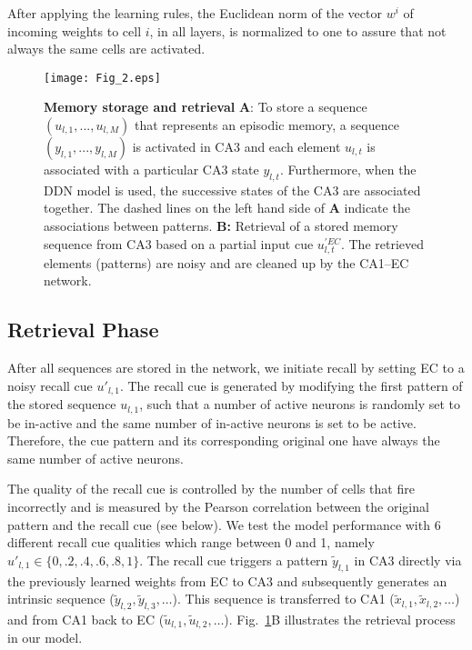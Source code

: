 \documentclass[utf8]{frontiersSCNS} %
\begin{document}
After applying the learning rules, the Euclidean norm of the vector $w^i$ of incoming weights to cell $i$, in all layers, is normalized to one to assure that not always the same cells are activated. 

\begin{figure}[!htb]
\centering\texttt{[image: Fig\_2.eps]}
\caption{\textbf{Memory storage and retrieval} \textbf A: To store a sequence $(u_{l,1} , . . . ,u_{l,M})$ that represents an episodic memory, a sequence $(y_{l,1} , . . . ,y_{l,M})$ is activated in CA3 and each element $u_{l,t}$ is associated with a particular CA3 state $y_{l,t}$. Furthermore, when the DDN model is used, the successive states of the CA3 are associated together. The dashed lines on the left hand side of \textbf{A} indicate the associations between patterns.  
\textbf{B:} Retrieval of a stored memory sequence from CA3 based on a partial input cue $u^{'EC}_{l,t}$. The retrieved elements (patterns) are noisy and are cleaned up by the CA1–EC network.}
\label{Fig_2}
\end{figure}

\subsection{Retrieval Phase}
\label{S:4}

After all sequences are stored in the network, we initiate recall by setting EC to a noisy recall cue $u'_{l, 1}$.  The recall cue is generated by modifying the first pattern of the stored sequence $u_{l, 1}$, such that a number of active neurons is randomly set to be in-active and the same number of in-active neurons is set to be active. 
%
Therefore, the cue pattern and its corresponding original one have always the same number of active neurons. 
 

The quality of the recall cue is controlled by the number of cells that fire incorrectly and is measured by the Pearson correlation between the original pattern and the recall cue (see below). We test the model performance with $6$ different recall cue qualities which range between 0 and 1, namely $ u'_{l, 1} \in \{ 0, .2, .4, .6, .8, 1 \} $.       
%
The recall cue triggers a pattern $\tilde{y}_{l, 1}$ in CA3 directly via the previously learned weights from EC to CA3 and subsequently generates an intrinsic sequence ($\tilde{y}_{l, 2}, \tilde{y}_{l, 3}, \ldots$). This sequence is transferred to CA1 ($\tilde{x}_{l, 1}, \tilde{x}_{l, 2}, \ldots$) and from CA1 back to EC ($\tilde{u}_{l, 1}, \tilde{u}_{l, 2}, \ldots$). Fig.~\ref{Fig_2}B illustrates the retrieval process in our model. 
\end{document}
